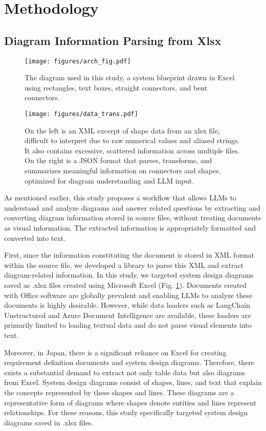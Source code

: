 \section{Methodology}
\label{sec:methodology}
\subsection{Diagram Information Parsing from Xlsx}
\begin{figure}
    \texttt{[image: figures/arch\_fig.pdf]}
    \caption{The diagram used in this study, a system blueprint drawn in Excel using rectangles, text boxes, straight connectors, and bent connectors.}
    \label{fig:arch}
\end{figure}
\begin{figure}
    \texttt{[image: figures/data\_trans.pdf]}
    \caption{\small
    On the left is an XML excerpt of shape data from an xlsx file, difficult to interpret due to raw numerical values and aliased strings. It also contains excessive, scattered information across multiple files. On the right is a JSON format that parses, transforms, and summarizes meaningful information on connectors and shapes, optimized for diagram understanding and LLM input.
    }
    \label{fig:data_trans}
\end{figure}
As mentioned earlier, this study proposes a workflow that allows LLMs to understand and analyze diagrams and answer related questions by extracting and converting diagram information stored in source files, without treating documents as visual information. The extracted information is appropriately formatted and converted into text.

First, since the information constituting the document is stored in XML format within the source file, we developed a library to parse this XML and extract diagram-related information. In this study, we targeted system design diagrams saved as .xlsx files created using Microsoft Excel (Fig. \ref{fig:arch}). Documents created with Office software are globally prevalent and enabling LLMs to analyze these documents is highly desirable. However, while data loaders such as LangChain Unstructured and Azure Document Intelligence are available, these loaders are primarily limited to loading textual data and do not parse visual elements into text.

Moreover, in Japan, there is a significant reliance on Excel for creating requirement definition documents and system design diagrams. Therefore, there exists a substantial demand to extract not only table data but also diagrams from Excel. System design diagrams consist of shapes, lines, and text that explain the concepts represented by these shapes and lines. These diagrams are a representative form of diagrams where shapes denote entities and lines represent relationships. For these reasons, this study specifically targeted system design diagrams saved in .xlsx files.



